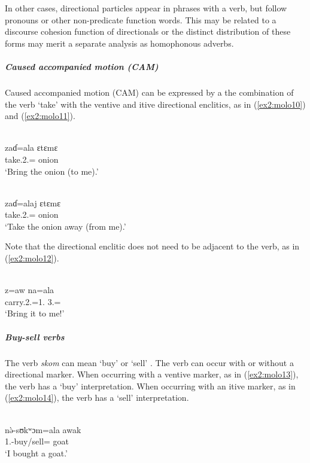 In other cases, directional particles appear in phrases with a verb, but follow pronouns or other non-predicate function words. This may be related to a discourse cohesion function of directionals \citep[241]{friesenGrammarMoloko2017} or the distinct distribution of these forms may merit a separate analysis as homophonous adverbs. 

\subparagraph{Caused accompanied motion (CAM)}

Caused accompanied motion (CAM) can be expressed by a the combination of the verb `take' with the ventive and itive directional enclitics, as in (\ref{ex2:molo10}) and (\ref{ex2:molo11}). 

\ea\label{ex2:molo10}
 \\
\gll  zaɗ=ala ɛtɛmɛ \\
take.2.= onion	\\
\glt `Bring the onion (to me).'

\ex\label{ex2:molo11}
 \\
\gll  zaɗ=alaj ɛtɛmɛ	\\
take.2.= onion	\\
\glt `Take the onion away (from me).'
\z 

Note that the directional enclitic does not need to be adjacent to the verb, as in (\ref{ex2:molo12}).

\ea\label{ex2:molo12}
 \\
\gll z=aw na=ala \\
carry.2.=1. 3.= \\
\glt `Bring it to me!'
\z

\subparagraph{Buy-sell verbs}

The verb \textit{skom} can mean `buy' or `sell'	\citep[292]{friesenGrammarMoloko2017}. The verb can occur with or without a directional marker. When occurring with a ventive marker, as in (\ref{ex2:molo13}), the verb has a `buy' interpretation. When occurring with an itive marker, as in (\ref{ex2:molo14}), the verb has a `sell' interpretation. 

\ea\label{ex2:molo13}
 \\
\gll nə̀-sʊkʷɔm=ala awak\\
1.-buy/sell= goat	\\
\glt `I bought a goat.'

